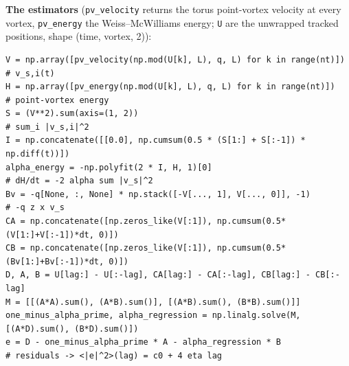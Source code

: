 \documentclass[11pt,a4paper]{article}
\begin{document}
\noindent\textbf{The estimators} (\texttt{pv\_velocity} returns the torus point-vortex velocity at every vortex,
\texttt{pv\_energy} the Weiss--McWilliams energy; \texttt{U} are the unwrapped tracked positions, shape (time,
vortex, 2)):
\begin{lstlisting}
V = np.array([pv_velocity(np.mod(U[k], L), q, L) for k in range(nt)])      # v_s,i(t)
H = np.array([pv_energy(np.mod(U[k], L), q, L) for k in range(nt)])        # point-vortex energy
S = (V**2).sum(axis=(1, 2))                                               # sum_i |v_s,i|^2
I = np.concatenate([[0.0], np.cumsum(0.5 * (S[1:] + S[:-1]) * np.diff(t))])
alpha_energy = -np.polyfit(2 * I, H, 1)[0]                                # dH/dt = -2 alpha sum |v_s|^2
Bv = -q[None, :, None] * np.stack([-V[..., 1], V[..., 0]], -1)             # -q z x v_s
CA = np.concatenate([np.zeros_like(V[:1]), np.cumsum(0.5*(V[1:]+V[:-1])*dt, 0)])
CB = np.concatenate([np.zeros_like(V[:1]), np.cumsum(0.5*(Bv[1:]+Bv[:-1])*dt, 0)])
D, A, B = U[lag:] - U[:-lag], CA[lag:] - CA[:-lag], CB[lag:] - CB[:-lag]
M = [[(A*A).sum(), (A*B).sum()], [(A*B).sum(), (B*B).sum()]]
one_minus_alpha_prime, alpha_regression = np.linalg.solve(M, [(A*D).sum(), (B*D).sum()])
e = D - one_minus_alpha_prime * A - alpha_regression * B                 # residuals -> <|e|^2>(lag) = c0 + 4 eta lag
\end{lstlisting}



\end{document}

